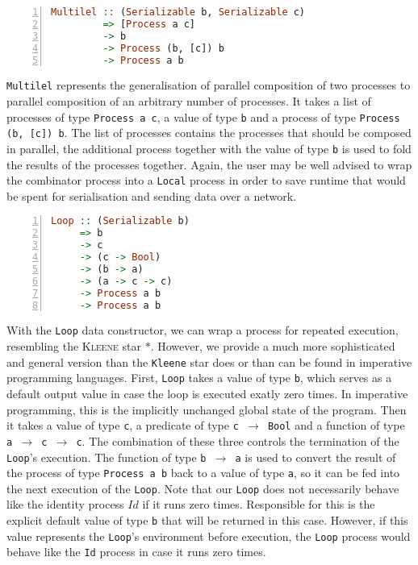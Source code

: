 \begin{lstlisting}[language=Haskell,caption=Signature of the \texttt{Multilel} type constructor.,numbers=left,frame=bt]
Multilel :: (Serializable b, Serializable c)
         => [Process a c]
         -> b
         -> Process (b, [c]) b
         -> Process a b
\end{lstlisting}
\texttt{Multilel} represents the generalisation of parallel composition of two processes to parallel composition of an arbitrary number of processes. It takes a list of processes of type \texttt{Process a c}, a value of type \texttt{b} and a process of type \texttt{Process (b, [c]) b}. The list of processes contains the processes that should be composed in parallel, the additional process together with the value of type \texttt{b} is used to fold the results of the processes together. Again, the user may be well advised to wrap the combinator process into a \texttt{Local} process in order to save runtime that would be spent for serialisation and sending data over a network. 

\begin{lstlisting}[language=Haskell,caption=Signature of the \texttt{Loop} type constructor.,numbers=left,frame=bt]
Loop :: (Serializable b)
     => b
     -> c
     -> (c -> Bool)
     -> (b -> a)
     -> (a -> c -> c)
     -> Process a b
     -> Process a b
\end{lstlisting}
With the \texttt{Loop} data constructor, we can wrap a process for repeated execution, resembling the \textsc{Kleene} star $*$. However, we provide a much more sophisticated and general version than the \texttt{Kleene} star does or than can be found in imperative programming languages. First, \texttt{Loop} takes a value of type \texttt{b}, which serves as a default output value in case the loop is executed exatly zero times. In imperative programming, this is the implicitly unchanged global state of the program. Then it takes a value of type \texttt{c}, a predicate of type \texttt{c $\to$ Bool} and a function of type \texttt{a $\to$ c $\to$ c}. The combination of these three controls the termination of the \texttt{Loop}'s execution. The function of type \texttt{b $\to$ a} is used to convert the result of the process of type \texttt{Process a b} back to a value of type \texttt{a}, so it can be fed into the next execution of the \texttt{Loop}. Note that our \texttt{Loop} does not necessarily behave like the identity process $Id$ if it runs zero times. Responsible for this is the explicit default value of type \texttt{b} that will be returned in this case. However, if this value represents the \texttt{Loop}'s environment before execution, the \texttt{Loop} process would behave like the \texttt{Id} process in case it runs zero times. 

